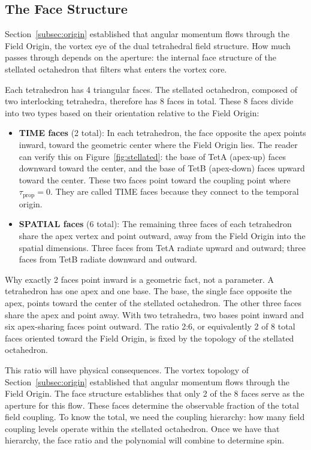 \documentclass[aps,prd,preprint,superscriptaddress,showpacs,preprintnumbers,amsmath,amssymb,nofootinbib]{revtex4-2}
\begin{document}
\subsection{The Face Structure}
\label{subsec:faces}

Section~\ref{subsec:origin} established that angular momentum flows through the Field Origin, the vortex eye of the dual tetrahedral field structure. How much passes through depends on the aperture: the internal face structure of the stellated octahedron that filters what enters the vortex core.

Each tetrahedron has 4 triangular faces. The stellated octahedron, composed of two interlocking tetrahedra, therefore has 8 faces in total. These 8 faces divide into two types based on their orientation relative to the Field Origin:

\begin{itemize}
\item \textbf{TIME faces} (2 total): In each tetrahedron, the face opposite the apex points inward, toward the geometric center where the Field Origin lies. The reader can verify this on Figure~\ref{fig:stellated}: the base of TetA (apex-up) faces downward toward the center, and the base of TetB (apex-down) faces upward toward the center. These two faces point toward the coupling point where $\tau_{\text{prop}} = 0$. They are called TIME faces because they connect to the temporal origin.
\item \textbf{SPATIAL faces} (6 total): The remaining three faces of each tetrahedron share the apex vertex and point outward, away from the Field Origin into the spatial dimensions. Three faces from TetA radiate upward and outward; three faces from TetB radiate downward and outward.
\end{itemize}

Why exactly 2 faces point inward is a geometric fact, not a parameter. A tetrahedron has one apex and one base. The base, the single face opposite the apex, points toward the center of the stellated octahedron. The other three faces share the apex and point away. With two tetrahedra, two bases point inward and six apex-sharing faces point outward. The ratio 2:6, or equivalently 2 of 8 total faces oriented toward the Field Origin, is fixed by the topology of the stellated octahedron.

This ratio will have physical consequences. The vortex topology of Section~\ref{subsec:origin} established that angular momentum flows through the Field Origin. The face structure establishes that only 2 of the 8 faces serve as the aperture for this flow. These faces determine the observable fraction of the total field coupling. To know the total, we need the coupling hierarchy: how many field coupling levels operate within the stellated octahedron. Once we have that hierarchy, the face ratio and the polynomial will combine to determine spin.
\end{document}
